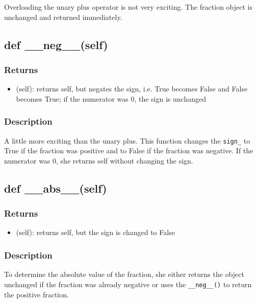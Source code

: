 \documentclass[refman]{scrartcl}
\begin{document}
Overloading the unary plus operator is not very exciting. The fraction object is unchanged and returned immediately.

\subsection{def \_\_neg\_\_(self)}

\subsubsection*{Returns}

\begin{itemize}
	\item (self): returns self, but negates the sign, i.e. True becomes False and False becomes True; if the numerator was 0, the sign is unchanged
  \end{itemize}

\subsubsection*{Description}

A little more exciting than the unary plus. This function changes the \texttt{sign\_} to True if the fraction was positive and to False if the fraction was negative. If the numerator was 0, she returns self without changing the sign.

\subsection{def \_\_abs\_\_(self)}

\subsubsection*{Returns}

\begin{itemize}
	\item (self): returns self, but the sign is changed to False
\end{itemize}

\subsubsection*{Description}

To determine the absolute value of the fraction, she either returns the object unchanged if the fraction was already negative or uses the \texttt{\_\_neg\_\_()} to return the positive fraction.
\end{document}
